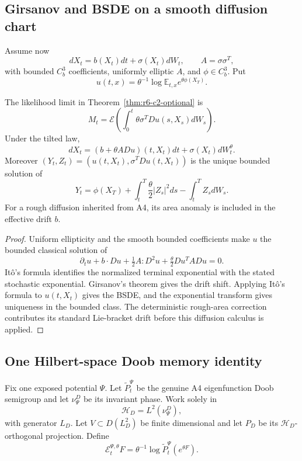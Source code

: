 \subsection{Girsanov and BSDE on a smooth diffusion chart}

Assume now
\[
dX_t=b(X_t)dt+\sigma(X_t)dW_t,
\qquad A=\sigma\sigma^T,
\]
with bounded \(C_b^3\) coefficients, uniformly elliptic \(A\), and
\(\phi\in C_b^3\).  Put
\[
u(t,x)=\theta^{-1}\log
\mathbb E_{t,x}e^{\theta\phi(X_T)}.
\]

\begin{theorem}
\label{thm:r6-c2-girsanov}
The likelihood limit in Theorem~\ref{thm:r6-c2-optional} is
\[
M_t=\mathcal E\left(
\int_0^t\theta\sigma^TDu(s,X_s)dW_s
\right).
\]
Under the tilted law,
\[
dX_t=(b+\theta A Du)(t,X_t)dt+\sigma(X_t)dW_t^\theta.
\]
Moreover
\((Y_t,Z_t)=(u(t,X_t),\sigma^TDu(t,X_t))\) is the unique bounded solution of
\[
Y_t=\phi(X_T)+
\int_t^T\frac\theta2|Z_s|^2ds-
\int_t^TZ_sdW_s.
\]
For a rough diffusion inherited from A4, its area anomaly is included in the
effective drift \(b\).
\end{theorem}

\begin{proof}
Uniform ellipticity and the smooth bounded coefficients make \(u\) the bounded
classical solution of
\[
\partial_tu+b\cdot Du+\tfrac12A:D^2u+\tfrac\theta2Du^TADu=0.
\]
Itô's formula identifies the normalized terminal exponential with the stated
stochastic exponential.  Girsanov's theorem gives the drift shift.  Applying
Itô's formula to \(u(t,X_t)\) gives the BSDE, and the exponential transform
gives uniqueness in the bounded class.  The deterministic rough-area
correction contributes its standard Lie-bracket drift before this diffusion
calculus is applied.
\end{proof}

\subsection{One Hilbert-space Doob memory identity}

Fix one exposed potential \(\Psi\).  Let
\(\widetilde P_t^\Psi\) be the genuine A4 eigenfunction Doob semigroup and let
\(\nu_\Psi^D\) be its invariant phase.  Work solely in
\[
\mathcal H_D=L^2(\nu_\Psi^D),
\]
with generator \(L_D\).  Let \(V\subset D(L_D^2)\) be finite dimensional and
let \(P_D\) be its \(\mathcal H_D\)-orthogonal projection.  Define
\[
\mathcal E_t^{\Psi,\theta}F
=\theta^{-1}\log
\widetilde P_t^\Psi(e^{\theta F}).
\]

